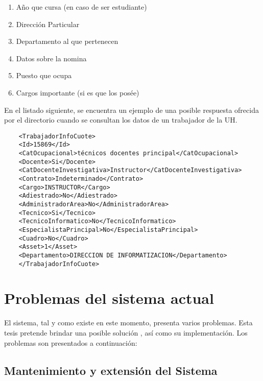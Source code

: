 \begin{enumerate}
	\item Año que cursa (en caso de ser estudiante)
	\item Direcci\'on Particular
	\item Departamento al que pertenecen
	\item Datos sobre la nomina
	\item Puesto que ocupa
	\item Cargos importante (si es que los pos\'ee)
\end{enumerate}

En el listado siguiente, se encuentra un ejemplo de una posible respuesta ofrecida por el 
directorio cuando se consultan los datos de un trabajador de la UH.

\begin{verbatim}
	<TrabajadorInfoCuote>
	<Id>15869</Id>
	<CatOcupacional>técnicos docentes principal</CatOcupacional>
	<Docente>Si</Docente>
	<CatDocenteInvestigativa>Instructor</CatDocenteInvestigativa>
	<Contrato>Indeterminado</Contrato>
	<Cargo>INSTRUCTOR</Cargo>
	<Adiestrado>No</Adiestrado>
	<AdministradorArea>No</AdministradorArea>
	<Tecnico>Si</Tecnico>
	<TecnicoInformatico>No</TecnicoInformatico>
	<EspecialistaPrincipal>No</EspecialistaPrincipal>
	<Cuadro>No</Cuadro>
	<Asset>1</Asset>
	<Departamento>DIRECCION DE INFORMATIZACION</Departamento>
	</TrabajadorInfoCuote>
\end{verbatim}

\section{Problemas del sistema actual}

El sistema, tal y como existe en este momento, presenta varios problemas. Esta tesis 
pretende brindar una posible solución  , así como su implementación. Los problemas son 
presentados a continuación:

\subsection{Mantenimiento y extensión del Sistema}

